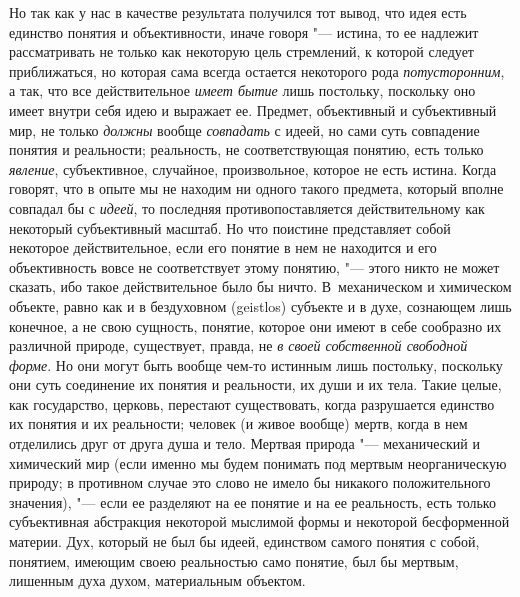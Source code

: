 {{Но так как у нас в качестве результата получился тот вывод,
что идея есть единство понятия и объективности, иначе говоря
"--- истина, то ее надлежит рассматривать не только как
некоторую цель стремлений, к которой следует приближаться, но которая сама
всегда остается некоторого рода
{\em потусторонним}, а
так, что все действительное {\em имеет
бытие} лишь постольку, поскольку оно имеет внутри себя идею
и выражает ее. Предмет, объективный и субъективный мир, не только
{\em должны} вообще
{\em совпадать}
с идеей, но сами суть совпадение понятия и реальности;
реальность, не соответствующая понятию, есть только
{\em явление},
субъективное, случайное, произвольное, которое не есть
истина. Когда говорят, что в опыте мы не находим ни одного такого предмета,
который вполне совпадал бы с
{\em идеей}, то последняя
противопоставляется действительному как некоторый
субъективный масштаб. Но что поистине представляет собой некоторое
действительное, если его понятие в нем не находится и его объективность
вовсе не соответствует этому понятию, "--- этого никто не может
сказать, ибо такое действительное было бы ничто. В~механическом и
химическом объекте, равно как и в бездуховном (geistlos)
субъекте и в духе, сознающем лишь конечное, а не свою
сущность, понятие, которое они имеют в себе сообразно их различной природе,
существует, правда, не {\em в своей
собственной свободной форме}. Но они могут быть вообще
чем-то истинным лишь постольку, поскольку они суть соединение их понятия и
реальности, их души и их тела. Такие целые, как государство, церковь,
перестают существовать, когда разрушается единство их понятия и их
реальности; человек (и живое вообще) мертв, когда в нем отделились друг от
друга душа и тело. Мертвая природа "--- механический и
химический мир (если именно мы будем понимать под мертвым неорганическую
природу; в противном случае это слово не имело бы никакого положительного
значения), "--- если ее разделяют на ее понятие и на ее
реальность, есть только субъективная абстракция некоторой мыслимой формы и
некоторой бесформенной материи. Дух, который не был бы идеей, единством
самого понятия с собой, понятием, имеющим своею реальностью само понятие,
был бы мертвым, лишенным духа духом, материальным объектом.

}}
